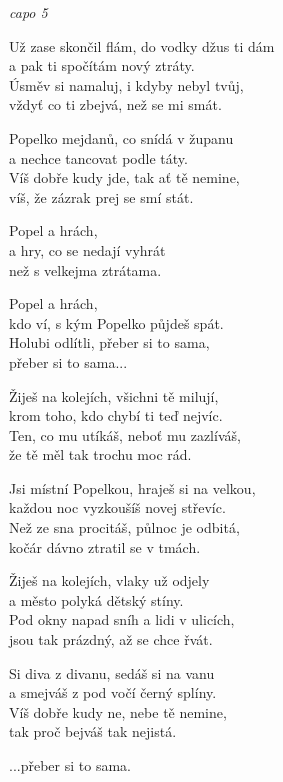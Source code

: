 
\re{}
\textit{capo 5}

\ve{}
Už zase skončil flám, do vodky džus ti dám\\
a pak ti spočítám nový ztráty. \\
Úsměv si namaluj, i kdyby nebyl tvůj,\\
vždyť co ti zbejvá, než se mi smát. 

Popelko mejdanů, co snídá v županu\\
a nechce tancovat podle táty.\\
Víš dobře kudy jde, tak ať tě nemine,\\
víš, že zázrak prej se smí stát. 

\cho{}
Popel a hrách,\\
a hry, co se nedají vyhrát \\
než s velkejma ztrátama.

Popel a hrách,\\
kdo ví, s kým Popelko půjdeš spát.\\
Holubi odlítli, přeber si to sama, \\
přeber si to sama... 

\ve{}
Žiješ na kolejích, všichni tě milují,\\
krom toho, kdo chybí ti teď nejvíc.\\
Ten, co mu utíkáš, neboť mu zazlíváš,\\
že tě měl tak trochu moc rád.

Jsi místní Popelkou, hraješ si na velkou,\\
každou noc vyzkoušíš novej střevíc.\\
Než ze sna procitáš, půlnoc je odbitá,\\
kočár dávno ztratil se v tmách.

\cho{}

\ve{}
Žiješ na kolejích, vlaky už odjely\\
a město polyká dětský stíny.\\
Pod okny napad sníh a lidi v ulicích,\\
jsou tak prázdný, až se chce řvát. 

Si diva z divanu, sedáš si na vanu\\
a smejváš z pod vočí černý splíny.\\
Víš dobře kudy ne, nebe tě nemine,\\
tak proč bejváš tak nejistá. 

\cho{}
...přeber si to sama.

\esong{}